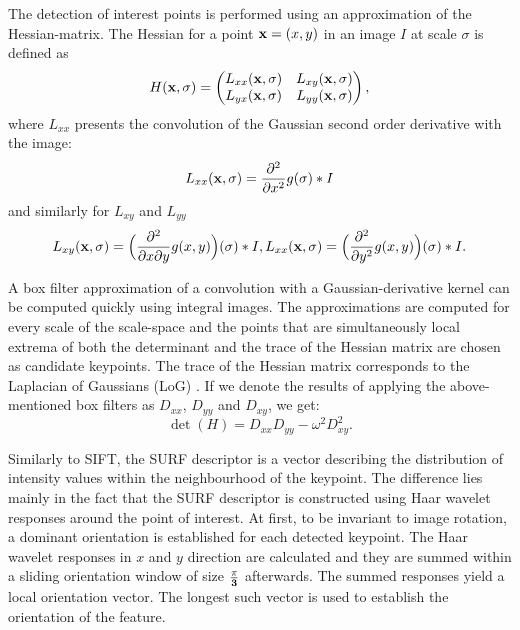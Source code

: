 The detection of interest points is performed using an approximation of the Hessian-matrix.
The Hessian for a point $\mathbf{x} = (x, y)$ in an image $I$ at scale $\sigma$ is defined as
$$H(\mathbf{x}, \sigma) = \begin{pmatrix} 
L_{xx}(\mathbf{x}, \sigma) & L_{xy}(\mathbf{x}, \sigma) \\ 
L_{yx}(\mathbf{x}, \sigma) & L_{yy}(\mathbf{x}, \sigma)
\end{pmatrix},$$
where $L_{xx}$ presents the convolution of the Gaussian second order derivative with the image:
\[
L_{xx}(\mathbf{x}, \sigma) = \frac{\partial ^{2}}{\partial x^{2}}g(\sigma) * I
\]
and similarly for $L_{xy}$ and $L_{yy}$
\[
L_{xy}(\mathbf{x}, \sigma) = \Big(\frac{\partial ^{2}}{\partial x \partial y}g(x, y)\Big)(\sigma) * I, 
L_{xx}(\mathbf{x}, \sigma) = \Big(\frac{\partial ^{2}}{\partial y^{2}}g(x, y)\Big)(\sigma) * I.
\]

A box filter approximation of a convolution with a Gaussian-derivative kernel can be computed quickly using integral images. 
The approximations are computed for every scale of the scale-space and 
the points that are simultaneously local extrema of both the determinant and the trace of the Hessian matrix are chosen as candidate keypoints. 
The trace of the Hessian matrix corresponds to the Laplacian of Gaussians (LoG) .
If we denote the results of applying the above-mentioned box filters as $D_{xx}$, $D_{yy}$ and $D_{xy}$, we get: 
\[
\det(H) = D_{xx} D_{yy} - \omega^{2} D_{xy}^{2}.
\]

Similarly to SIFT, the SURF descriptor is a vector describing the distribution of intensity values within the neighbourhood of the keypoint. 
The difference lies mainly in the fact that the SURF descriptor is constructed using Haar wavelet responses around the point of interest. %
At first, to be invariant to image rotation, a dominant orientation is established for each detected keypoint. 
The Haar wavelet responses in $x$ and $y$ direction are calculated 
and they are summed within a sliding orientation window of size $\mathbf{\frac{\pi}{3}}$ afterwards. 
The summed responses yield a local orientation vector. 
The longest such vector is used to establish the orientation of the feature. 


